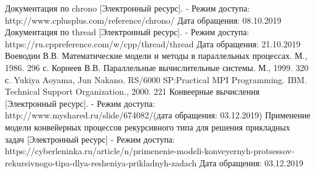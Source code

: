 \documentclass[a4paper,12pt]{article}
\begin{document}
\newpage
{}

\begin{thebibliography}{}
     Документация по chrono [Электронный ресурс]. -
    Режим доступа: http://www.cplusplus.com/reference/chrono/
    Дата обращения: 08.10.2019
     Документация по thread [Электронный ресурс]. -
    Режим доступа: https://ru.cppreference.com/w/cpp/thread/thread
    Дата обращения: 21.10.2019
     Воеводин В.В. Математические модели и методы в параллельных процессах. М., 1986. 296 с.
     Корнеев В.В. Параллельные вычислительные системы. М., 1999. 320 с.
     Yukiya Aoyama, Jun Nakano. RS/6000 SP:Practical MPI Programming. IBM. Technical Support Organization., 2000. 221
     Конвеерные вычисления [Электронный ресурс]. - Режим доступа: http://www.myshared.ru/slide/674082/(дата обращения: 03.12.2019)
     Применение модели конвейерных процессов рекурсивного типа для решения прикладных задач [Электронный ресурс] - Режим доступа: https://cyberleninka.ru/article/n/primenenie-modeli-konveyernyh-protsessov-rekursivnogo-tipa-dlya-resheniya-prikladnyh-zadach Дата обращения: 03.12.2019
\end{thebibliography}
\end{document}
